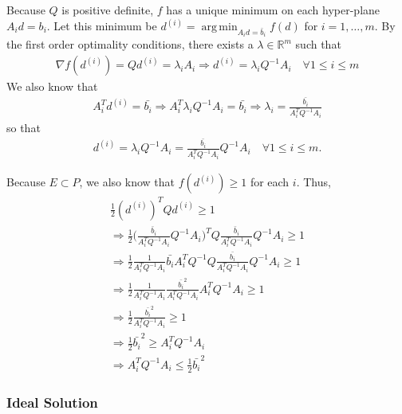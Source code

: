 \documentclass{article}
\theoremstyle{case}
\newcommand{\Rm}{\mathbb R^m}
\DeclareMathOperator*{\argmin}{arg\,min}
\begin{document}
Because $Q$ is positive definite, $f$ has a unique minimum on each hyper-plane $A_i d = b_i$.
Let this minimum be $d^{(i)} = \argmin_{A_id =\bar{b}_i} f(d)$ for $i=1,\ldots,m$.
By the first order optimality conditions, there exists a $\lambda \in \Rm$ such that
\begin{align*}
\nabla f(d^{(i)}) = Q d^{(i)} = \lambda_i A_i 
\Longrightarrow d^{(i)} = \lambda_i Q^{-1}A_i \quad \forall 1\le i\le m
\end{align*}
We also know that
\begin{align*}
A_i^T d^{(i)} = \bar{b_i} \Longrightarrow
A_i^T \lambda_i Q^{-1}A_i = \bar{b_i} \Longrightarrow
\lambda_i = \frac {\bar{b_i}}{A_i^T  Q^{-1}A_i}
\end{align*}
so that
\begin{align*}
d^{(i)} = \lambda_i Q^{-1}A_i = \frac {\bar{b_i}}{A_i^T  Q^{-1}A_i}  Q^{-1}A_i \quad \forall 1\le i\le m.
\end{align*}

Because $E \subset P$, we also know that $f(d^{(i)}) \ge 1$ for each $i$. Thus,
\begin{align*}
\frac 1 2 (d^{(i)})^{T} Q d^{(i)} \ge 1 \\
\Longrightarrow \frac 1 2 \bigg(\frac {\bar{b}_i}{A_i^T  Q^{-1}A_i}  Q^{-1}A_i\bigg)^{T} Q \frac {\bar{b}_i}{A_i^T  Q^{-1}A_i}  Q^{-1}A_i \ge 1 \\
\Longrightarrow \frac 1 2 \frac {1}{A_i^T  Q^{-1}A_i}  \bar{b_i} A_i^T Q^{-1} Q \frac {\bar{b_i}}{A_i^T  Q^{-1}A_i}  Q^{-1}A_i \ge 1 \\
\Longrightarrow \frac 1 2 \frac {1}{A_i^T  Q^{-1}A_i}  \frac {\bar{b_i}^2}{A_i^T  Q^{-1}A_i}  A_i^T Q^{-1}A_i \ge 1 \\
\Longrightarrow \frac 1 2  \frac {\bar{b_i}^2}{A_i^T  Q^{-1}A_i} \ge 1 \\
\Longrightarrow \frac 1 2 \bar{b_i}^2\ge A_i^T  Q^{-1}A_i \\
\Longrightarrow A_i^T  Q^{-1}A_i \le \frac 1 2 \bar{b_i}^2
\end{align*}











\subsubsection{Ideal Solution}
\label{ideal_ellipsoid_in_polyhedron}
\end{document}
